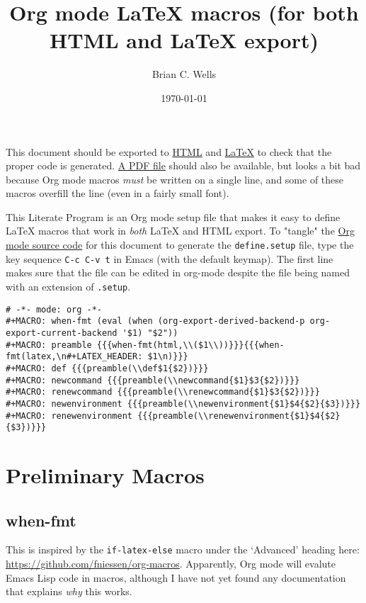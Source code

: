 \documentclass[11pt]{article}
\author{Brian C. Wells}
\date{\today}
\title{Org mode \LaTeX{} macros (for both HTML and \LaTeX{} export)}
\begin{document}
\maketitle
\tableofcontents

This document should be exported to \href{define.html}{HTML} and \href{define.tex}{\LaTeX{}} to check that the
proper code is generated.  \href{define.pdf}{A PDF file} should also be available, but
looks a bit bad because Org mode macros \emph{must} be written on a single
line, and some of these macros overfill the line (even in a fairly
small font).

This Literate Program is an Org mode setup file that makes it easy to
define \LaTeX{} macros that work in \emph{both} \LaTeX{} and HTML export.  To
"tangle" the \href{define.org}{Org mode source code} for this document to generate the
\verb~define.setup~ file, type the key sequence \verb~C-c C-v t~ in Emacs (with
the default keymap).  The first line makes sure that the file can be
edited in org-mode despite the file being named with an extension of
\verb~.setup~.

\begin{verbatim}
# -*- mode: org -*-
#+MACRO: when-fmt (eval (when (org-export-derived-backend-p org-export-current-backend '$1) "$2"))
#+MACRO: preamble {{{when-fmt(html,\\($1\\))}}}{{{when-fmt(latex,\n#+LATEX_HEADER: $1\n)}}}
#+MACRO: def {{{preamble(\\def$1{$2})}}}
#+MACRO: newcommand {{{preamble(\\newcommand{$1}$3{$2})}}}
#+MACRO: renewcommand {{{preamble(\\renewcommand{$1}$3{$2})}}}
#+MACRO: newenvironment {{{preamble(\\newenvironment{$1}$4{$2}{$3})}}}
#+MACRO: renewenvironment {{{preamble(\\renewenvironment{$1}$4{$2}{$3})}}}
\end{verbatim}

\section{Preliminary Macros}
\label{sec-1}

\subsection{when-fmt}
\label{sec-1-1}

This is inspired by the \verb~if-latex-else~ macro under the `Advanced'
heading here: \url{https://github.com/fniessen/org-macros}. Apparently,
Org mode will evalute Emacs Lisp code in macros, although I have not
yet found any documentation that explains \emph{why} this works.
\end{document}
